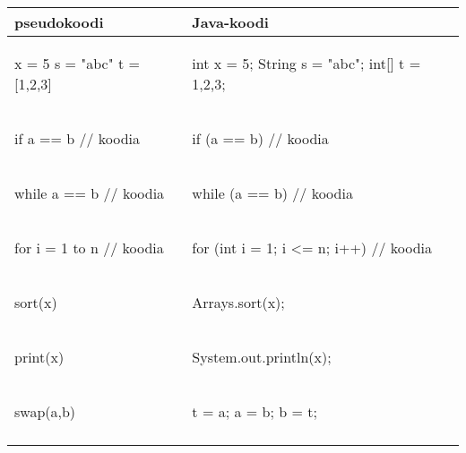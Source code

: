 \begin{table}
\center
\begin{tabular}{ll}
pseudokoodi & Java-koodi \\
\hline
\begin{smallcode}[xleftmargin=0pt]
x = 5
s = "abc"
t = [1,2,3]
\end{smallcode}
&
\begin{smallcode}
int x = 5;
String s = "abc";
int[] t = {1,2,3};
\end{smallcode}
\\
\begin{smallcode}[xleftmargin=0pt]
if a == b
    // koodia
\end{smallcode}
&
\begin{smallcode}
if (a == b) {
    // koodia
}
\end{smallcode}
\\
\begin{smallcode}[xleftmargin=0pt]
while a == b
    // koodia
\end{smallcode}
&
\begin{smallcode}
while (a == b) {
    // koodia
}
\end{smallcode}
\\
\begin{smallcode}[xleftmargin=0pt]
for i = 1 to n
    // koodia
\end{smallcode}
&
\begin{smallcode}
for (int i = 1; i <= n; i++) {
    // koodia
}
\end{smallcode}
\\
\begin{smallcode}[xleftmargin=0pt]
sort(x)
\end{smallcode}
&
\begin{smallcode}
Arrays.sort(x);
\end{smallcode}
\\
\begin{smallcode}[xleftmargin=0pt]
print(x)
\end{smallcode}
&
\begin{smallcode}
System.out.println(x);
\end{smallcode}
\\
\begin{smallcode}[xleftmargin=0pt]
swap(a,b)
\end{smallcode}
&
\begin{smallcode}
t = a;
a = b;
b = t;
\end{smallcode}
\\
\begin{smallcode}[xleftmargin=0pt]

\end{smallcode}
\end{tabular}
\end{table}
